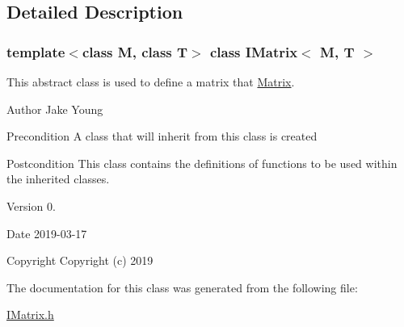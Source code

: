 \subsection{Detailed Description}
\subsubsection*{template$<$class M, class T$>$\newline
class I\+Matrix$<$ M, T $>$}

This abstract class is used to define a matrix that \mbox{\hyperlink{class_matrix}{Matrix}}. 

\begin{DoxyAuthor}{Author}
Jake Young 
\end{DoxyAuthor}
\begin{DoxyPrecond}{Precondition}
A class that will inherit from this class is created 
\end{DoxyPrecond}
\begin{DoxyPostcond}{Postcondition}
This class contains the definitions of functions to be used within the inherited classes. 
\end{DoxyPostcond}
\begin{DoxyVersion}{Version}
0. 
\end{DoxyVersion}
\begin{DoxyDate}{Date}
2019-\/03-\/17
\end{DoxyDate}
\begin{DoxyCopyright}{Copyright}
Copyright (c) 2019 
\end{DoxyCopyright}


The documentation for this class was generated from the following file\+:\begin{DoxyCompactItemize}
\item 
\mbox{\hyperlink{_i_matrix_8h}{I\+Matrix.\+h}}\end{DoxyCompactItemize}
